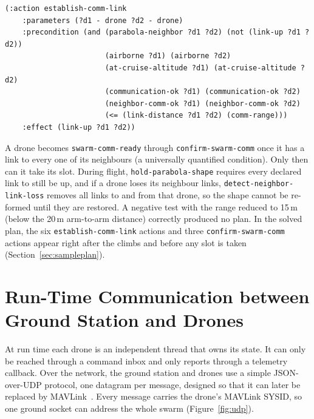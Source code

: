 \documentclass[11pt,a4paper,oneside]{report}
\newcommand{\code}[1]{\texttt{#1}}
\begin{document}
\begin{lstlisting}
(:action establish-comm-link
    :parameters (?d1 - drone ?d2 - drone)
    :precondition (and (parabola-neighbor ?d1 ?d2) (not (link-up ?d1 ?d2))
                       (airborne ?d1) (airborne ?d2)
                       (at-cruise-altitude ?d1) (at-cruise-altitude ?d2)
                       (communication-ok ?d1) (communication-ok ?d2)
                       (neighbor-comm-ok ?d1) (neighbor-comm-ok ?d2)
                       (<= (link-distance ?d1 ?d2) (comm-range)))
    :effect (link-up ?d1 ?d2))
\end{lstlisting}

\noindent A drone becomes \code{swarm-comm-ready} through \code{confirm-swarm-comm} once it has
a link to every one of its neighbours (a universally quantified condition). Only then can it
take its slot. During flight, \code{hold-parabola-shape} requires every declared link to still be
up, and if a drone loses its neighbour links, \code{detect-neighbor-link-loss} removes all links
to and from that drone, so the shape cannot be re-formed until they are restored. A negative test
with the range reduced to 15\,m (below the 20\,m arm-to-arm distance) correctly produced no plan.
In the solved plan, the six \code{establish-comm-link} actions and three
\code{confirm-swarm-comm} actions appear right after the climbs and before any slot is taken
(Section~\ref{sec:sampleplan}).

\section{Run-Time Communication between Ground Station and Drones}
At run time each drone is an independent thread that owns its state. It can only be reached
through a command inbox and only reports through a telemetry callback. Over the network, the
ground station and drones use a simple JSON-over-UDP protocol, one datagram per message, designed
so that it can later be replaced by MAVLink~\cite{mavlink}. Every message carries the drone's
MAVLink SYSID, so one ground socket can address the whole swarm
(Figure~\ref{fig:udp}).
\end{document}
